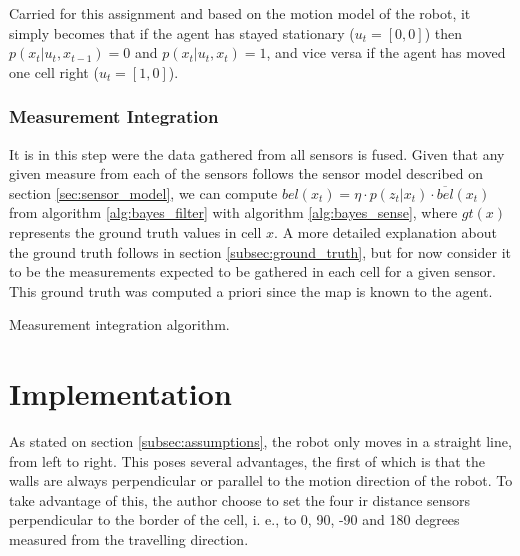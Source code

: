 \documentclass[runningheads]{llncs}
\begin{document}
Carried for this assignment and based on the motion model of the robot, it simply becomes that if the agent has stayed stationary ($u_t = [0, 0]$) then $p(x_t \vert u_t, x_{t-1}) = 0$ and $p(x_t \vert u_t, x_t) = 1$, and vice versa if the agent has moved one cell right ($u_t = [1, 0]$).

\subsubsection{Measurement Integration}

It is in this step were the data gathered from all sensors is fused. Given that any given measure from each of the sensors follows the sensor model described on section \ref{sec:sensor_model}, we can compute $bel(x_t) = \eta \cdot p(z_t \vert x_t) \cdot \overline{bel}(x_t)$ from algorithm \ref{alg:bayes_filter} with algorithm \ref{alg:bayes_sense}, where $gt(x)$ represents the ground truth values in cell $x$. A more detailed explanation about the ground truth follows in section \ref{subsec:ground_truth}, but for now consider it to be the measurements expected to be gathered in each cell for a given sensor. This ground truth was computed a priori since the map is known to the agent.

\begin{algorithm}[!ht]
    \DontPrintSemicolon



\caption{Measurement integration algorithm.}
\label{alg:bayes_sense}
\end{algorithm}
\FloatBarrier

\section{Implementation}
\label{sec:implementation}

As stated on section \ref{subsec:assumptions}, the robot only moves in a straight line, from left to right. This poses several advantages, the first of which is that the walls are always perpendicular or parallel to the motion direction of the robot. To take advantage of this, the author choose to set the four \gls{ir} distance sensors perpendicular to the border of the cell, i. e., to 0, 90, -90 and 180 degrees measured from the travelling direction.
\end{document}
